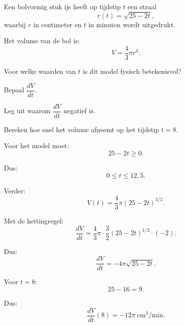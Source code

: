 \documentclass{ximera}
\begin{document}
\begin{oefening}{\oefG}

Een bolvormig stuk ijs heeft op tijdstip $t$ een straal
\[
r(t)=\sqrt{25-2t},
\]
waarbij $r$ in centimeter en $t$ in minuten wordt uitgedrukt.

Het volume van de bol is:
\[
V=\frac{4}{3}\pi r^3.
\]

\begin{question}
Voor welke waarden van $t$ is dit model fysisch betekenisvol?
\end{question}

\begin{question}
Bepaal $\dfrac{dV}{dt}$.
\end{question}

\begin{question}
Leg uit waarom $\dfrac{dV}{dt}$ negatief is.
\end{question}

\begin{question}
Bereken hoe snel het volume afneemt op het tijdstip $t=8$.
\end{question}

\begin{oplossing}

Voor het model moet:
\[
25-2t\geq0.
\]

Dus:
\[
\boxed{0\leq t\leq12{,}5.}
\]

Verder:
\[
V(t)=\frac{4}{3}\pi(25-2t)^{3/2}.
\]

Met de kettingregel:
\[
\frac{dV}{dt}
=
\frac{4}{3}\pi\cdot\frac32(25-2t)^{1/2}\cdot(-2).
\]

Dus:
\[
\boxed{\frac{dV}{dt}=-4\pi\sqrt{25-2t}.}
\]

Voor $t=8$:
\[
25-16=9.
\]

Dus:
\[
\boxed{\frac{dV}{dt}(8)=-12\pi\ \mathrm{cm^3/min}.}
\]

\end{oplossing}

\end{oefening}
\end{document}
